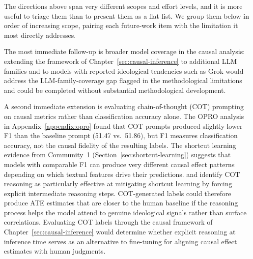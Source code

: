 The directions above span very different scopes and effort levels, and it is more useful to triage them than to present them as a flat list. We group them below in order of increasing scope, pairing each future-work item with the limitation it most directly addresses.

The most immediate follow-up is broader model coverage in the causal analysis: extending the framework of Chapter~\ref{sec:causal-inference} to additional LLM families and to models with reported ideological tendencies such as Grok \citep{xai2024grok} would address the LLM-family-coverage gap flagged in the methodological limitations and could be completed without substantial methodological development.

A second immediate extension is evaluating chain-of-thought (COT) prompting on causal metrics rather than classification accuracy alone. The OPRO analysis in Appendix~\ref{appendix:opro} found that COT prompts produced slightly lower F1 than the baseline prompt (51.47 vs.\ 51.86), but F1 measures classification accuracy, not the causal fidelity of the resulting labels. The shortcut learning evidence from Community~1 (Section~\ref{sec:shortcut-learning}) suggests that models with comparable F1 can produce very different causal effect patterns depending on which textual features drive their predictions. \citet{yuan2024llmsovercomeshortcutlearning} and \citet{sun-etal-2024-exploring} identify COT reasoning as particularly effective at mitigating shortcut learning by forcing explicit intermediate reasoning steps. COT-generated labels could therefore produce ATE estimates that are closer to the human baseline if the reasoning process helps the model attend to genuine ideological signals rather than surface correlations. Evaluating COT labels through the causal framework of Chapter~\ref{sec:causal-inference} would determine whether explicit reasoning at inference time serves as an alternative to fine-tuning for aligning causal effect estimates with human judgments.

